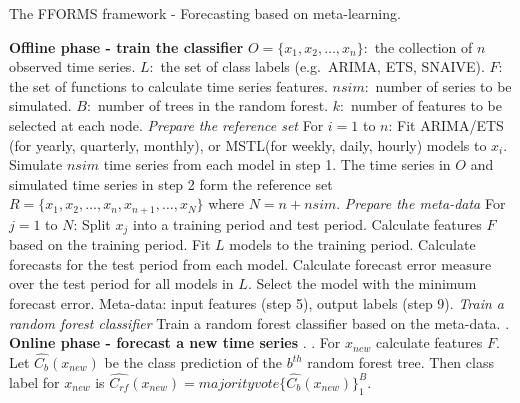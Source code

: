 \documentclass[11pt,a4paper,]{article}
\begin{document}
\begin{algorithm}[!ht]
\centering\footnotesize
  \caption{The FFORMS framework - Forecasting based on meta-learning. }
  \label{alg:algo-lab}
  \begin{algorithmic}[1]
    \Statex \textbf{Offline phase - train the classifier}
    \Statex {}
    \Statex \hspace{1cm}$O=\{x_1, x_2, \dots,x_n\}:$ the collection of $n$ observed time series.
      \Statex \hspace{1cm}$L:$ the set of class labels (e.g.\ ARIMA, ETS, SNAIVE).
         \Statex \hspace{1cm}$F:$ the set of functions to calculate time series features.
         \Statex \hspace{1cm}$nsim:$ number of series to be simulated.
         \Statex \hspace{1cm}$B:$ number of trees in the random forest.
         \Statex \hspace{1cm}$k:$ number of features to be selected at each node.
     \Statex {}
      \Statex \hspace{1cm}
      \Statex
     \Statex \textit{Prepare the reference set}
    \Statex For $i=1$ to $n$:
            \State Fit ARIMA/ETS (for yearly, quarterly, monthly), or MSTL(for weekly, daily, hourly) models to $x_i$.
            \State Simulate $nsim$ time series from each model in step 1.
            \State The time series in $O$ and simulated time series in step 2 form the reference set $R=\{x_1, x_2, \dots,x_n, x_{n+1},\dots,x_N\}$ where $N = n + nsim$.
    \Statex
    \Statex \textit{Prepare the meta-data}
    \Statex For $j=1$ to $N$:
            \State Split $x_j$ into a training period and test period.
            \State Calculate features $F$ based on the training period.
            \State Fit $L$ models to the training period.
            \State Calculate forecasts for the test period from each model.
            \State Calculate forecast error measure over the test period for all models in $L$.
            \State Select the model with the minimum forecast error.
            \State Meta-data: input features (step 5), output labels (step 9).
     \Statex
    \Statex \textit{Train a random forest classifier}
            \State Train a random forest classifier based on the meta-data.
            .
    \Statex
     \Statex \textbf{Online phase - forecast a new time series}
    \Statex {}
    \Statex \hspace{1cm} .
     \Statex {}
      \Statex \hspace{1cm}.
  \State For $x_{new}$ calculate features $F$.
  \State Let $\hat{C_b}(x_{new})$ be the class prediction of the $b^{th}$ random forest tree. Then class label for $x_{new}$ is $\hat{C_{rf}}(x_{new})=majorityvote\{\hat{C_b}(x_{new})\}_1^B$.
   \end{algorithmic}
\end{algorithm}
\end{document}
